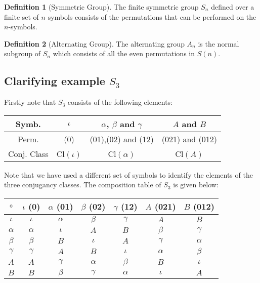 \documentclass[a4paper,10pt]{article}
\theoremstyle{definition}
\newtheorem{definition}{Definition}[section]
\begin{document}
\begin{definition}[Symmetric Group] 
The finite symmetric group $S_n$ defined over a finite set of $n$ symbols consists of the permutations that can be performed on the $n$-symbols. 
\end{definition}

\begin{definition}[Alternating Group]
The alternating group $A_n$ is the normal subgroup of $S_n$ which consists of all the even permutations in $S(n)$. 
\end{definition} 

\subsection{Clarifying example $S_3$}
Firstly note that $S_3$ consists of the following elements:

\begin{center}
  \begin{tabular}{ | c || c | c | c | }
    \hline
    Symb. & $\iota$ & $\alpha$, $\beta$ and $\gamma$ & $A$ and $B$ \\ 
    \hline
    Perm. & (0) & (01),(02) and (12) & (021) and (012)\\ 
    \hline
    Conj. Class & Cl$(\iota)$ & Cl$(\alpha)$ & Cl$(A)$ \\ \hline
  \end{tabular}
\end{center}

Note that we have used a different set of symbols to identify the elements of the three conjugancy classes. The composition table of $S_3$ is given below:

\begin{center}
  \begin{tabular}{ | c || c | c | c | c | c | c |}
    \hline
    $\circ$&$\iota$ (0)&$\alpha$ (01)&$\beta$ (02)&$\gamma$ (12)&$A$ (021)&$B$ (012)\\
    \hline
    \hline
    $\iota$&$\iota$&$\alpha$&$\beta$&$\gamma$&$A$&$B$ \\
    \hline
    $\alpha$&$\alpha$&$\iota$&$A$&$B$&$\beta$&$\gamma$ \\
    \hline
    $\beta$&$\beta$&$B$&$\iota$&$A$&$\gamma$&$\alpha$\\
    \hline
    $\gamma$&$\gamma$&$A$&$B$&$\iota$&$\alpha$&$\beta$\\
    \hline
    $A$&$A$&$\gamma$&$\alpha$&$\beta$&$B$&$\iota$\\
    \hline
    $B$&$B$&$\beta$&$\gamma$&$\alpha$&$\iota$&$A$\\
    \hline
  \end{tabular}
\end{center}
\end{document}
